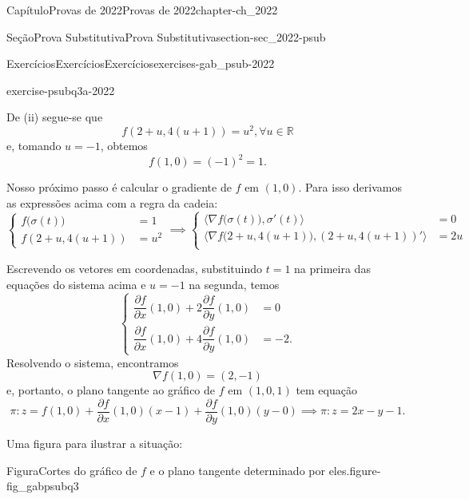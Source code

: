 \documentclass[oneside,10pt,]{book}
\numberwithin{equation}{section}
\begin{document}
\begin{chapterptx}{Capítulo}{Provas de 2022}{}{Provas de 2022}{}{}{chapter-ch_2022}
\begin{sectionptx}{Seção}{Prova Substitutiva}{}{Prova Substitutiva}{}{}{section-sec_2022-psub}
\begin{exercises-subsection-numberless}{Exercícios}{Exercícios}{}{Exercícios}{}{}{exercises-gab_psub-2022}
\begin{divisionexercise}{3}{}{}{exercise-psubq3a-2022}
%
\par
De (ii) segue-se que%
\begin{equation*}
f(2+u, 4(u+1))=u^2, \forall u \in
\mathbb{R}
\end{equation*}
e, tomando \(u=-1\), obtemos%
\begin{equation*}
\boxed{f(1,0) =
(-1)^2 = 1}.
\end{equation*}
%
\par
Nosso próximo passo é calcular o gradiente de \(f\) em \((1,0)\). Para isso derivamos as expressões acima com a regra da cadeia:%
\begin{equation*}
\begin{cases}
f\big(\sigma(t)\big)& = 1\\
f(2+u, 4(u+1))&=u^2
\end{cases}\implies
\begin{cases}
\Big\langle\nabla f\big(\sigma (t)\big),
\sigma'(t)\Big\rangle&=0\\
\Big\langle\nabla f\big(2+u, 4(u+1)\big),
(2+u, 4(u+1))'\Big\rangle&=2u\\
\end{cases}
\end{equation*}
%
\par
Escrevendo os vetores em coordenadas, substituindo \(t=1\) na primeira das equações do sistema acima e \(u=-1\) na segunda, temos%
\begin{equation*}
\begin{cases}
\dfrac{\partial f}{\partial x}(1,0) + 2 \dfrac{\partial
f}{\partial y}(1,0)&=0\\
\dfrac{\partial f}{\partial x}(1,0) + 4\dfrac{\partial f}{\partial
y}(1,0)&= -2.
\end{cases}
\end{equation*}
Resolvendo o sistema, encontramos%
\begin{equation*}
\boxed{\nabla f(1,0) = (2,-1)}
\end{equation*}
e, portanto, o plano tangente ao gráfico de \(f\) em \((1,0,1)\) tem equação%
\begin{equation*}
\pi\colon z=f(1,0) + \frac{\partial f}{\partial x}(1,0)(x-1) +
\frac{\partial f}{\partial y}(1,0)(y-0)\implies \pi\colon z= 2x-y-1.
\end{equation*}
%
\par
Uma figura para ilustrar a situação:%
\begin{figureptx}{Figura}{Cortes do gráfico de \(f\) e o plano tangente determinado por eles.}{figure-fig_gabpsubq3}{}%
\begin{image}{0}{1}{0}{}%

\end{image}
\end{figureptx}
\end{divisionexercise}
\end{exercises-subsection-numberless}
\end{sectionptx}
\end{chapterptx}
\end{document}
